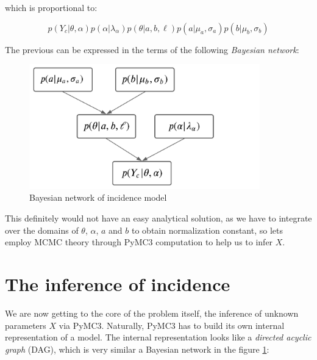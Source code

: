 \documentclass[
  digital, %
  oneside, %
  lof,     %
  lot,     %
]{fithesis4}
\begin{document}
which is proportional to:

\begin{equation}\label{eq:inc-model-joint-expanded}
   p( Y_c | \theta, \alpha ) p( \alpha | \lambda_\alpha ) p ( \theta | a, b, \ell ) p ( a | \mu_a, \sigma_a ) p ( b | \mu_b, \sigma_b )
\end{equation}

The previous can be expressed in the terms of the following \textit{Bayesian network}:

\begin{figure}[H]
  \begin{center}
    \includegraphics[width=10cm]{static/images/bayesian-network.png}
  \end{center}
  \caption{Bayesian network of incidence model}
  \label{fig:inc-model-bayesian-network}
\end{figure}

This definitely would not have an easy analytical solution, as we have to integrate over the domains of $\theta$, $\alpha$, $a$ and $b$ to obtain normalization constant, so lets employ MCMC theory through PyMC3 computation to help us to infer $X$.


\section{The inference of incidence}
\label{sec:inference-of-incidence}

We are now getting to the core of the problem itself, the inference of unknown parameters $X$ via PyMC3. 
Naturally, PyMC3 has to build its own internal representation of a model.
The internal representation looks like a \textit{directed acyclic graph} (DAG), which is very similar a Bayesian network in the figure \ref{fig:inc-model-bayesian-network}:
\end{document}
